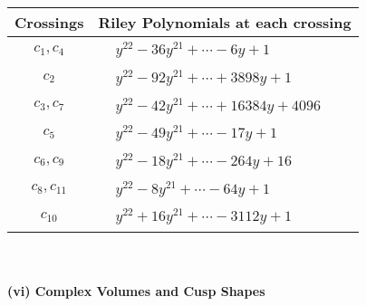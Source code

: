 \documentclass[1p]{elsarticle_modified}
\theoremstyle{definition}
\begin{document}
\begin{tabular}{m{50pt}|m{274pt}}
Crossings & \hspace{64pt}Riley Polynomials at each crossing \\
\hline $$\begin{aligned}c_{1},c_{4}\end{aligned}$$&$\begin{aligned}
&y^{22}-36 y^{21}+\cdots-6 y+1
\end{aligned}$\\
\hline $$\begin{aligned}c_{2}\end{aligned}$$&$\begin{aligned}
&y^{22}-92 y^{21}+\cdots+3898 y+1
\end{aligned}$\\
\hline $$\begin{aligned}c_{3},c_{7}\end{aligned}$$&$\begin{aligned}
&y^{22}-42 y^{21}+\cdots+16384 y+4096
\end{aligned}$\\
\hline $$\begin{aligned}c_{5}\end{aligned}$$&$\begin{aligned}
&y^{22}-49 y^{21}+\cdots-17 y+1
\end{aligned}$\\
\hline $$\begin{aligned}c_{6},c_{9}\end{aligned}$$&$\begin{aligned}
&y^{22}-18 y^{21}+\cdots-264 y+16
\end{aligned}$\\
\hline $$\begin{aligned}c_{8},c_{11}\end{aligned}$$&$\begin{aligned}
&y^{22}-8 y^{21}+\cdots-64 y+1
\end{aligned}$\\
\hline $$\begin{aligned}c_{10}\end{aligned}$$&$\begin{aligned}
&y^{22}+16 y^{21}+\cdots-3112 y+1
\end{aligned}$\\
\hline
\end{tabular}\\~\\
\newpage\flushleft \textbf{(vi) Complex Volumes and Cusp Shapes}
\end{document}
